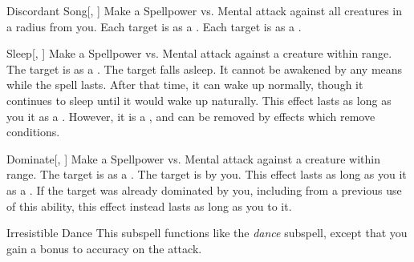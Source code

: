 \begin{ability}[\nth{4}]{Discordant Song}[, ]
Make a Spellpower vs. Mental attack against all creatures in a \areamed radius from you.
\hit Each target is \disoriented as a .
\crit Each target is \confused as a .
\end{ability}
\vspace{0.25em}


\begin{ability}[\nth{4}]{Sleep}[, ]
Make a Spellpower vs. Mental attack against a creature within \rngmed range.
\hit The target is \blinded as a .
\crit The target falls asleep.
It cannot be awakened by any means while the spell lasts.
After that time, it can wake up normally, though it continues to sleep until it would wake up naturally.
This effect lasts as long as you  it as a .
However, it is a , and can be removed by effects which remove conditions.
\end{ability}
\vspace{0.25em}


\begin{ability}[\nth{5}]{Dominate}[, ]
Make a Spellpower vs. Mental attack against a creature within \rngmed range.
\hit The target is  as a .
\crit The target is  by you.
This effect lasts as long as you  it as a .
If the target was already dominated by you, including from a previous use of this ability, this effect instead lasts as long as you  to it.
\end{ability}
\vspace{0.25em}


\begin{ability}[\nth{9}]{Irresistible Dance}
This subspell functions like the \textit{dance} subspell, except that you gain a  bonus to accuracy on the attack.
\end{ability}
\vspace{0.25em}

